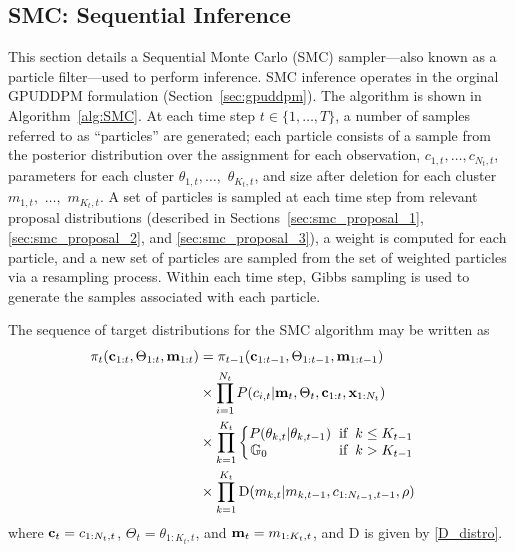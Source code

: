 \documentclass[twocolumn, final]{svjour3}
\begin{document}
\subsection{SMC: Sequential Inference}
\label{sec:SMC}

This section details a Sequential Monte Carlo (SMC) sampler---also known as a particle filter---used to perform inference. SMC inference operates in the orginal GPUDDPM formulation (Section~\ref{sec:gpuddpm}). The algorithm is shown in Algorithm~\ref{alg:SMC}. At each time step $t \in \{ 1, \ldots, T \}$, a number of samples referred to as ``particles'' are generated; each particle consists of a sample from the posterior distribution over the assignment for each observation, $c_{1,t}, \ldots, c_{N_{t}, t}$, parameters for each cluster $\theta_{1,t}, \ldots,$ $\theta_{K_{t}, t}$, and size after deletion for each cluster $m_{1,t},$ $\ldots,$ $m_{K_{t},t}$. A set of particles is sampled at each time step from relevant proposal distributions (described in Sections~\ref{sec:smc_proposal_1}, \ref{sec:smc_proposal_2}, and \ref{sec:smc_proposal_3}), a weight is computed for each particle, and a new set of particles are sampled from the set of weighted particles via a resampling process. Within each time step, Gibbs sampling is used to generate the samples associated with each particle.

The sequence of target distributions for the SMC algorithm may be written as
\begin{equation}
\begin{split}
\pi_{t}(\bold{c}_{1:t}, \Theta_{1:t}, \bold{m}_{1:t}) & =  \pi_{t-1}(\bold{c}_{1:t-1}, \Theta_{1:t-1}, \bold{m}_{1:t-1})\\
& \times \prod_{i=1}^{N_{t}} P(c_{i,t} | \bold{m}_{t}, \Theta_{t}, \bold{c}_{1:t}, \bold{x}_{1:N_{t}}) \\
& \times \prod_{k=1}^{K_{t}} 
\begin{cases}
\begin{split}
P(\theta_{k,t} | \theta_{k,t-1}) \hspace{2mm} & \text{if} \hspace{2mm} k \leq K_{t-1} \\
\mathbb{G}_{0} \hspace{18mm} & \text{if} \hspace{2mm} k > K_{t-1}
\end{split}
\end{cases} \\
& \times \prod_{k=1}^{K_{t}} \text{D}(m_{k,t} | m_{k,t-1}, c_{1:N_{t-1}, t-1}, \rho)
\end{split}
\end{equation}
where $\bold{c}_{t} = c_{1:N_{t},t}$, $\Theta_{t} = \theta_{1:K_{t},t}$, and $\bold{m}_{t} = m_{1:K_{t},t} $, and D is given by \eqref{D_distro}.
\end{document}

